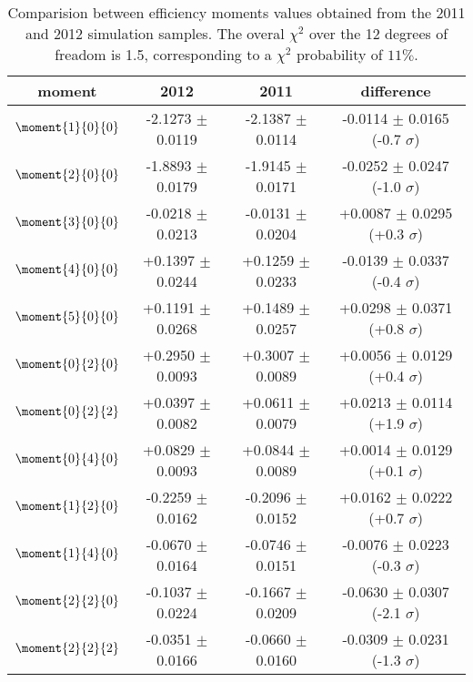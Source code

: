 
\begin{table}
\centering
\footnotesize
\begin{tabular}{c c c c}
  \hline
        moment         &  2012    &    2011  &   difference                        \\
  \hline
  $\moment{1}{0}{0}$   & -2.1273 $\pm$  0.0119  &  -2.1387 $\pm$  0.0114  &  -0.0114 $\pm$  0.0165 (-0.7 $\sigma$) \\
  $\moment{2}{0}{0}$   & -1.8893 $\pm$  0.0179  &  -1.9145 $\pm$  0.0171  &  -0.0252 $\pm$  0.0247 (-1.0 $\sigma$) \\
  $\moment{3}{0}{0}$   & -0.0218 $\pm$  0.0213  &  -0.0131 $\pm$  0.0204  &  +0.0087 $\pm$  0.0295 (+0.3 $\sigma$) \\
  $\moment{4}{0}{0}$   & +0.1397 $\pm$  0.0244  &  +0.1259 $\pm$  0.0233  &  -0.0139 $\pm$  0.0337 (-0.4 $\sigma$) \\
  $\moment{5}{0}{0}$   & +0.1191 $\pm$  0.0268  &  +0.1489 $\pm$  0.0257  &  +0.0298 $\pm$  0.0371 (+0.8 $\sigma$) \\
  $\moment{0}{2}{0}$   & +0.2950 $\pm$  0.0093  &  +0.3007 $\pm$  0.0089  &  +0.0056 $\pm$  0.0129 (+0.4 $\sigma$) \\
  $\moment{0}{2}{2}$   & +0.0397 $\pm$  0.0082  &  +0.0611 $\pm$  0.0079  &  +0.0213 $\pm$  0.0114 (+1.9 $\sigma$) \\
  $\moment{0}{4}{0}$   & +0.0829 $\pm$  0.0093  &  +0.0844 $\pm$  0.0089  &  +0.0014 $\pm$  0.0129 (+0.1 $\sigma$) \\
  $\moment{1}{2}{0}$   & -0.2259 $\pm$  0.0162  &  -0.2096 $\pm$  0.0152  &  +0.0162 $\pm$  0.0222 (+0.7 $\sigma$) \\
  $\moment{1}{4}{0}$   & -0.0670 $\pm$  0.0164  &  -0.0746 $\pm$  0.0151  &  -0.0076 $\pm$  0.0223 (-0.3 $\sigma$) \\
  $\moment{2}{2}{0}$   & -0.1037 $\pm$  0.0224  &  -0.1667 $\pm$  0.0209  &  -0.0630 $\pm$  0.0307 (-2.1 $\sigma$) \\
  $\moment{2}{2}{2}$   & -0.0351 $\pm$  0.0166  &  -0.0660 $\pm$  0.0160  &  -0.0309 $\pm$  0.0231 (-1.3 $\sigma$) \\
  \hline
\end{tabular}
\caption{Comparision between efficiency moments values obtained from the 2011 and 2012 \BsbarJpsiKst simulation samples.
         The overal $\chi^2$ over the 12 degrees of freadom is 1.5, corresponding to a $\chi^2$ probability of $11\%$.}
\label{moms_comp_periods_pos} 
\end{table}

